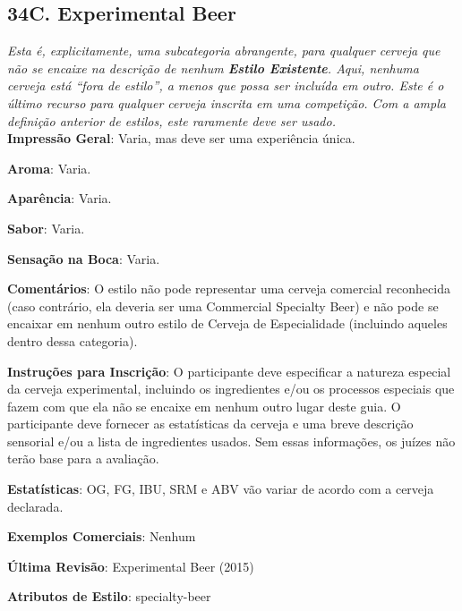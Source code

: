 \subsection*{34C. Experimental Beer}
\textit{Esta é, explicitamente, uma subcategoria abrangente, para qualquer cerveja que não se encaixe na descrição de nenhum \textbf{Estilo Existente}. Aqui, nenhuma cerveja está “fora de estilo”, a menos que possa ser incluída em outro. Este é o último recurso para qualquer cerveja inscrita em uma competição. Com a ampla definição anterior de estilos, este raramente deve ser usado.}\\
\textbf{Impressão Geral}: Varia, mas deve ser uma experiência única.

\textbf{Aroma}: Varia.

\textbf{Aparência}: Varia.

\textbf{Sabor}: Varia.

\textbf{Sensação na Boca}: Varia.

\textbf{Comentários}: O estilo não pode representar uma cerveja comercial reconhecida (caso contrário, ela deveria ser uma Commercial Specialty Beer) e não pode se encaixar em nenhum outro estilo de Cerveja de Especialidade (incluindo aqueles dentro dessa categoria).

\textbf{Instruções para Inscrição}: O participante deve especificar a natureza especial da cerveja experimental, incluindo os ingredientes e/ou os processos especiais que fazem com que ela não se encaixe em nenhum outro lugar deste guia. O participante deve fornecer as estatísticas da cerveja e uma breve descrição sensorial e/ou a lista de ingredientes usados. Sem essas informações, os juízes não terão base para a avaliação.

\textbf{Estatísticas}: OG, FG, IBU, SRM e ABV vão variar de acordo com a cerveja declarada.

\textbf{Exemplos Comerciais}: Nenhum

\textbf{Última Revisão}: Experimental Beer (2015)

\textbf{Atributos de Estilo}: specialty-beer
